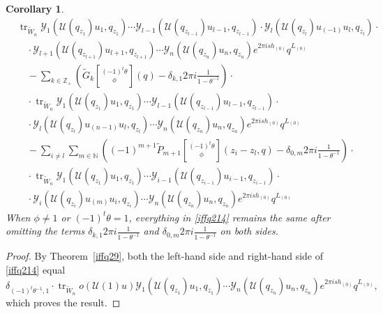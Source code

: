 \documentclass[9pt]{amsart}
\newtheorem{corollary}{Corollary}[section]
\newcommand{\Y}{\mathcal{Y}}
\begin{document}
\begin{corollary}
\begin{equation*}
\begin{aligned}
  &\operatorname{tr}_{\tilde{W}_n} \Y_1(\mathcal{U}(q_{z_1})u_1, q_{z_1}) \cdots \Y_{l-1}(\mathcal{U}(q_{z_{l-1}})u_{l-1}, q_{z_{l-1}}) \cdot \Y_l(\mathcal{U}(q_{z_l})u_{(-1)}u_l, q_{z_l}) \cdot \\
  &\quad\cdot \Y_{l+1}(\mathcal{U}(q_{z_{l+1}})u_{l+1}, q_{z_{l+1}}) \cdots \Y_n(\mathcal{U}(q_{z_n})u_n, q_{z_n}) e^{2\pi i s h_{(0)}} q^{L_{(0)}} \\
  &\quad- \sum_{k \in \mathbb{Z}_+} \left( \tilde{G}_k\genfrac[]{0pt}{0}{(-1)^t \theta}{\phi}(q) - \delta_{k,1} 2\pi i \frac{1}{1 - \theta^{-1}} \right) \cdot \\
  &\quad\cdot \operatorname{tr}_{\tilde{W}_n} \Y_1(\mathcal{U}(q_{z_1})u_1, q_{z_1}) \cdots \Y_{l-1}(\mathcal{U}(q_{z_{l-1}})u_{l-1}, q_{z_{l-1}}) \cdot \\
  &\quad\cdot \Y_l(\mathcal{U}(q_{z_l})u_{(n-1)}u_l, q_{z_l}) \cdots \Y_n(\mathcal{U}(q_{z_n})u_n, q_{z_n}) e^{2\pi i s h_{(0)}} q^{L_{(0)}} \\
  &\quad- \sum_{i \neq l} \sum_{m \in \mathbb{N}} \left( (-1)^{m+1} \tilde{P}_{m+1}\genfrac[]{0pt}{0}{(-1)^t \theta}{\phi}(z_i - z_l, q) - \delta_{0,m} 2\pi i \frac{1}{1 - \theta^{-1}} \right) \cdot \\
  &\quad\cdot \operatorname{tr}_{\tilde{W}_n} \Y_1(\mathcal{U}(q_{z_1})u_1, q_{z_1}) \cdots \Y_{i-1}(\mathcal{U}(q_{z_{i-1}})u_{i-1}, q_{z_{i-1}}) \cdot \\
  &\quad\cdot \Y_i(\mathcal{U}(q_{z_i})u_{(m)}u_i, q_{z_i}) \cdots \Y_n(\mathcal{U}(q_{z_n})u_n, q_{z_n}) e^{2\pi i s h_{(0)}} q^{L_{(0)}}
\end{aligned}
\end{equation*}
When $\phi \neq 1$ or $(-1)^t \theta = 1$, everything in \eqref{iffq214} remains the same after omitting the terms $\delta_{k,1} 2\pi i \frac{1}{1 - \theta^{-1}}$ and $\delta_{0,m} 2\pi i \frac{1}{1 - \theta^{-1}}$ on both sides.
\end{corollary}

\begin{proof}
By Theorem~\ref{iffq29}, both the left-hand side and right-hand side of \eqref{iffq214} equal
\[
\delta_{(-1)^t \theta^{-1}, 1} \cdot \operatorname{tr}_{\tilde{W}_n} o(\mathcal{U}(1)u) \Y_1(\mathcal{U}(q_{z_1})u_1, q_{z_1}) \cdots \Y_n(\mathcal{U}(q_{z_n})u_n, q_{z_n}) e^{2\pi i s h_{(0)}} q^{L_{(0)}},
\]
which proves the result.
\end{proof}
\end{document}
